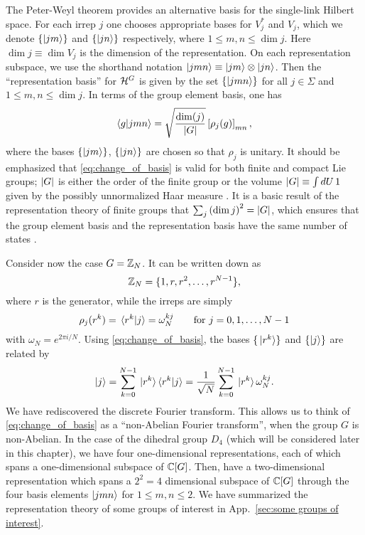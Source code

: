\medskip

The Peter-Weyl theorem provides an alternative basis for the single-link Hilbert space.
For each \ac{irrep} $j$ one chooses appropriate bases for $V_j^{\ast}$ and $V_j$, which we denote $\{\ket{jm}\}$ and $\{\ket{jn}\}$ respectively, where $1 \leq m,n \leq \dim{j}$.
Here $\dim{j} \equiv \dim{V_j}$ is the dimension of the representation.
On each representation subspace, we use the shorthand notation $\ket{jmn} \equiv \ket{jm} \otimes \ket{jn}$.
Then the ``representation basis'' for $\mathcal{H}^{G}$ is given by the set $\{\ket{jmn}\}$ for all $j \in \Sigma$ and $1 \leq m,n \leq \dim{j}$.
In terms of the group element basis, one has \cite{zohar2015latticegauge}
\begin{equation}
    \braket{g}{jmn} = \sqrt{\frac{\mathrm{dim}(j)}{\abs{G}}} \left[\rho_j(g)\right]_{mn},
    \label{eq:change_of_basis}
\end{equation}
where the bases $\{\ket{jm}\}$, $\{\ket{jn}\}$ are chosen so that $\rho_j$ is unitary.
It should be emphasized that \eqref{eq:change_of_basis} is valid for both finite and compact Lie groups; $\abs{G}$ is either the order of the finite group or the volume $\abs{G}\equiv\int dU\, 1$ given by the possibly unnormalized Haar measure \cite{milstead2018qyangmills, marianithesis}.
It is a basic result of the representation theory of finite groups that $\sum_j \pqty{\dim{j}}^2 = \abs{G}$, which ensures that the group element basis and the representation basis have the same number of states \cite{serre1967representations}.

Consider now the case $G = \mathbb{Z}_N$.
It can be written down as
\begin{equation*}
    \mathbb{Z}_N = \{1, r, r^2, \ldots, r^{N-1}\},
\end{equation*}
where $r$ is the generator, while the \acp{irrep} are simply
\begin{equation}
    \rho_j (r^k) = \braket*{r^k}{j} = \omega_N^{kj}
    \qquad \text{for~}  j = 0,1,\dots, N-1
\end{equation}
with $\omega_N= e^{2\pi i /N}$.
Using \eqref{eq:change_of_basis}, the bases $\{\ket*{r^k}\}$ and $\{\ket{j}\}$ are related by
\begin{equation}
    \ket{j}
    = \sum_{k=0}^{N-1} \ket*{r^k} \! \braket*{r^k}{j}
    = \frac{1}{\sqrt{N}} \sum_{k=0}^{N-1} \ket*{r^k} \omega_N^{kj}.
\end{equation}
We have rediscovered the discrete Fourier transform.
This allows us to think of \eqref{eq:change_of_basis} as a ``non-Abelian Fourier transform'', when the group $G$ is non-Abelian.
In the case of the dihedral group $D_4$ (which will be considered later in this chapter), we have four one-dimensional representations, each of which spans a one-dimensional subspace of $\mathbb{C}[G]$.
Then, have a two-dimensional representation which spans a $2^2=4$ dimensional subspace of $\mathbb{C}[G]$ through the four basis elements $\ket{jmn}$ for $1 \leq m, n \leq 2$.
We have summarized the representation theory of some groups of interest in App.~\ref{sec:some groups of interest}.

